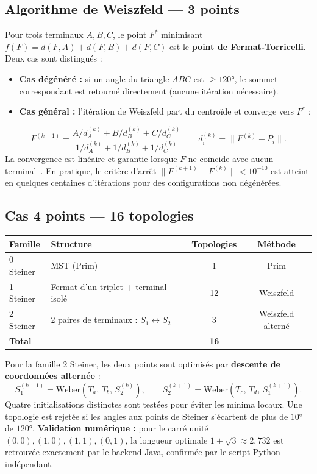 \documentclass[11pt, a4paper]{article}
\begin{document}
\subsection{Algorithme de Weiszfeld — 3 points}

Pour trois terminaux $A, B, C$, le point $F^*$ minimisant $f(F) = d(F,A)+d(F,B)+d(F,C)$
est le \textbf{point de Fermat-Torricelli}. Deux cas sont distingués :

\begin{itemize}
  \item \textbf{Cas dégénéré :} si un angle du triangle $ABC$ est $\geq 120°$,
        le sommet correspondant est retourné directement (aucune itération nécessaire).
  \item \textbf{Cas général :} l'itération de Weiszfeld part du centroïde et converge vers $F^*$ :
\end{itemize}
\[
  F^{(k+1)}
  = \frac{A/d_A^{(k)} + B/d_B^{(k)} + C/d_C^{(k)}}
         {1/d_A^{(k)} + 1/d_B^{(k)} + 1/d_C^{(k)}}
  \qquad d_i^{(k)} = \|F^{(k)} - P_i\|.
\]
La convergence est linéaire et garantie lorsque $F$ ne coïncide avec aucun terminal~\cite{weiszfeld1937}.
En pratique, le critère d'arrêt $\|F^{(k+1)} - F^{(k)}\| < 10^{-10}$ est atteint en quelques
centaines d'itérations pour des configurations non dégénérées.

\subsection{Cas 4 points — 16 topologies}

\begin{center}
\small\setlength{\tabcolsep}{5pt}
\begin{tabular}{@{}p{2.2cm} p{6cm} cc@{}}
\toprule
\textbf{Famille} & \textbf{Structure} & \textbf{Topologies} & \textbf{Méthode} \\
\midrule
0 Steiner & MST (Prim) & 1 & Prim \\
1 Steiner & Fermat d'un triplet + terminal isolé & 12 & Weiszfeld \\
2 Steiner & 2 paires de terminaux : $S_1 \leftrightarrow S_2$ & 3 & Weiszfeld alterné \\
\midrule
\textbf{Total} && \textbf{16} & \\
\bottomrule
\end{tabular}
\end{center}

Pour la famille 2 Steiner, les deux points sont optimisés par \textbf{descente de coordonnées alternée} :
\[
  S_1^{(k+1)} = \mathrm{Weber}(T_a,\, T_b,\, S_2^{(k)}),
  \qquad
  S_2^{(k+1)} = \mathrm{Weber}(T_c,\, T_d,\, S_1^{(k+1)}).
\]
Quatre initialisations distinctes sont testées pour éviter les minima locaux.
Une topologie est rejetée si les angles aux points de Steiner s'écartent de plus de $10°$ de $120°$.
\textbf{Validation numérique :} pour le carré unité $(0,0),(1,0),(1,1),(0,1)$,
la longueur optimale $1+\sqrt{3}\approx2{,}732$ est retrouvée exactement par le backend Java,
confirmée par le script Python indépendant.
\end{document}
